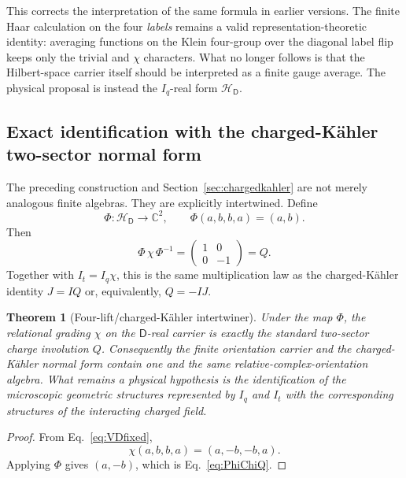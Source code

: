 \documentclass[11pt]{article}
\newtheorem{theorem}{Theorem}[section]
\theoremstyle{definition}\newtheorem{definition}[theorem]{Definition}
\theoremstyle{remark}\newtheorem{remark}[theorem]{Remark}\newtheorem{conjecture}[theorem]{Conjecture}
\begin{document}
This corrects the interpretation of the same formula in earlier versions. The finite Haar calculation on the four \emph{labels} remains a valid representation-theoretic identity: averaging functions on the Klein four-group over the diagonal label flip keeps only the trivial and $\chi$ characters. What no longer follows is that the Hilbert-space carrier itself should be interpreted as a finite gauge average. The physical proposal is instead the $I_q$-real form $\mathcal H_{\mathsf D}$.

\subsection{Exact identification with the charged-K\"ahler two-sector normal form}
The preceding construction and Section~\ref{sec:chargedkahler} are not merely analogous finite algebras. They are explicitly intertwined. Define
\begin{equation}\label{eq:PhiKahler}
 \Phi:\mathcal H_{\mathsf D}\longrightarrow\mathbb C^2,
 \qquad
 \Phi(a,b,b,a)=(a,b).
\end{equation}
Then
\begin{equation}\label{eq:PhiChiQ}
 \boxed{
 \Phi\,\chi\,\Phi^{-1}
 =\begin{pmatrix}1&0\\0&-1\end{pmatrix}=Q.}
\end{equation}
Together with $I_t=I_q\chi$, this is the same multiplication law as the charged-K\"ahler identity $J=IQ$ or, equivalently, $Q=-IJ$.

\begin{theorem}[Four-lift/charged-K\"ahler intertwiner]\label{thm:Kahlerfourlift}
Under the map $\Phi$, the relational grading $\chi$ on the $\mathsf D$-real carrier is exactly the standard two-sector charge involution $Q$. Consequently the finite orientation carrier and the charged-K\"ahler normal form contain one and the same relative-complex-orientation algebra. What remains a physical hypothesis is the identification of the microscopic geometric structures represented by $I_q$ and $I_t$ with the corresponding structures of the interacting charged field.
\end{theorem}
\begin{proof}
From Eq.~\eqref{eq:VDfixed},
\begin{equation}
 \chi(a,b,b,a)=(a,-b,-b,a).
\end{equation}
Applying $\Phi$ gives $(a,-b)$, which is Eq.~\eqref{eq:PhiChiQ}.
\end{proof}
\end{document}
